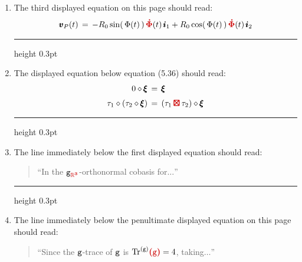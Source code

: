 \documentclass[12pt]{GeomPhysBOOK}
\newcommand\correct[1]{{\color{red!80!black}\bf #1}}
\newcommand\mcorrect[1]{{\color{red!80!black}\bm{#1}}}
\newcommand\listrule{\vspace{0.2cm}\hrule height 0.3pt}
\begin{document}
\begin{enumerate}[leftmargin=1.9cm,labelwidth=1.4cm,itemsep=0.5cm]
	\listrule\vspace{0.24cm}
	\item[\underline{page 16}:] 
		The third displayed equation on this page should read:
		\begin{align*}
			\VEC{v}_{P}(t) \,=\, -R_{0}\sin(\,\Phi(t)\,)\,\correct{\dot{\Phi}}(t)\,\VEC{i}_{1} +  R_{0}\cos(\,\Phi(t)\,)\,\correct{\dot{\Phi}}(t)\,\VEC{i}_{2}
		\end{align*}
	\listrule
	\item[\underline{page 74}:]
		The displayed equation below equation (5.36) should read:
		\begin{align*}
			0\diamond\pmb{\xi} &\,=\, \pmb{\xi} \\[0.1cm]
			\tau_{1}\diamond(\tau_{2}\diamond\pmb{\xi}) &\,=\, (\tau_{1}\,\mcorrect{\boxtimes}\,\tau_{2})\diamond \pmb{\xi}
		\end{align*}
	\listrule
	\item[\underline{page 177}:] 
		The line immediately below the first displayed equation should read:
		\begin{quote}
			``In the \correct{$\g_{\mcorrect{\RR^{3}}}$}-orthonormal cobasis for$\ldots$'' \\
		\end{quote}
	\listrule
	\item[\underline{page 248}:]
		The line immediately below the penultimate displayed equation on this page should read:
		\begin{quote}
			``Since the $\texttt{g}$-trace of $\texttt{g}$ is $\traceg\!\mcorrect{(\g)}=4$, taking$\ldots$'' \\
		\end{quote}
		

\end{enumerate}
\end{document}
